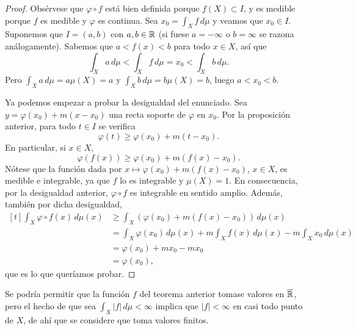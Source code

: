 \documentclass[a4paper, 11pt, oneside]{report}
\begin{document}
\begin{proof}
  Obsérvese que $\varphi \circ f$ está bien definida porque $f(X) \subset I$, y es medible porque $f$ es medible y $\varphi$ es continua. Sea $x_0 = \int_X f \, d\mu$ y veamos que $x_0 \in I$. Suponemos que $I = (a,b)$ con $a,b \in \mathbb R$ (si fuese $a = -\infty$ o $b = \infty$ se razona análogamente). Sabemos que $a < f(x) < b$ para todo $x \in X$, así que
  \[\int_X a \, d\mu < \int_X f \, d\mu = x_0 < \int_X b \, d\mu.\]
  Pero $\int_X a \, d\mu = a\mu(X) = a$ y $\int_X b \, d\mu = b\mu(X) = b$, luego $a < x_0 < b$.

  Ya podemos empezar a probar la desigualdad del enunciado. Sea $y = \varphi(x_0)+m(x-x_0)$ una recta soporte de $\varphi$ en $x_0$. Por la proposición anterior, para todo $t \in I$ se verifica 
  \[\varphi(t)\geq \varphi(x_0)+m(t-x_0).\]
  En particular, si $x \in X$,
  \[\varphi(f(x))\geq \varphi(x_0)+m(f(x)-x_0).\]
  Nótese que la función dada por $x \mapsto \varphi(x_0)+m(f(x)-x_0)$, $x \in X$, es medible e integrable, ya que $f$ lo es integrable y $\mu(X) = 1$. En consecuencia, por la desigualdad anterior, $\varphi \circ f$ es integrable en sentido amplio. Además, también por dicha desigualdad,
  \[
  \begin{aligned}[t]
    \int_X \varphi \circ f (x)\, d\mu(x) &\geq \int_X \left(\varphi(x_0)+m(f(x)-x_0)\right) \, d\mu(x) \\ 
    &= \int_X \varphi(x_0)\, d\mu(x)+m\int_X f(x) \, d\mu(x)-m\int_X x_0 \, d\mu(x) \\
    &= \varphi(x_0)+mx_0 - mx_0 \\
    &= \varphi(x_0),
  \end{aligned}\]
  que es lo que queríamos probar.
\end{proof}

Se podría permitir que la función $f$ del teorema anterior tomase valores en $\overline{\mathbb R}$, pero el hecho de que sea $\int_X |f| \, d\mu < \infty$ implica que $|f| < \infty$ en casi todo punto de $X$, de ahí que se considere que toma valores finitos.
\end{document}
